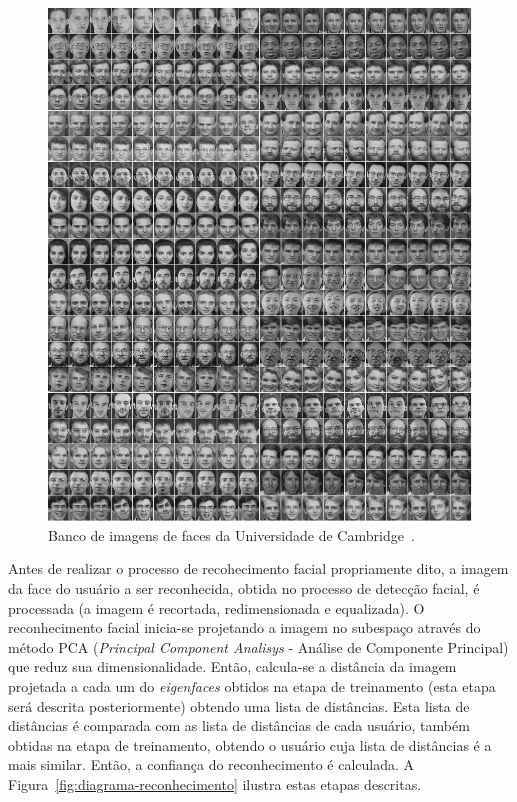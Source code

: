 		\begin{figure}[htb]
			\begin{center}
				\includegraphics[scale=0.3]{figuras/4.ProblemaEProposta/cambrigdefacedb.png}
			\end{center}
			\caption{Banco de imagens de faces da Universidade de Cambridge~\cite{cambridgeFaceDb}.}
			\label{fig:cambridgeFaceDb}
		\end{figure}


		Antes de realizar o processo de recohecimento facial propriamente dito, a imagem da face do usuário a ser reconhecida, obtida no processo de detecção facial, é processada (a imagem é recortada, redimensionada e equalizada). O reconhecimento facial inicia-se projetando a imagem no subespaço através do método PCA (\textit{Principal Component Analisys} - Análise de Componente Principal) que reduz sua dimensionalidade. Então, calcula-se a distância da imagem projetada a cada um do \textit{eigenfaces} obtidos na etapa de treinamento (esta etapa será descrita posteriormente) obtendo uma lista de distâncias. Esta lista de distâncias é comparada com as lista de distâncias de cada usuário, também obtidas na etapa de treinamento, obtendo o usuário cuja lista de distâncias é a mais similar. Então, a confiança do reconhecimento é calculada. A Figura~\ref{fig:diagrama-reconhecimento} ilustra estas etapas descritas.

